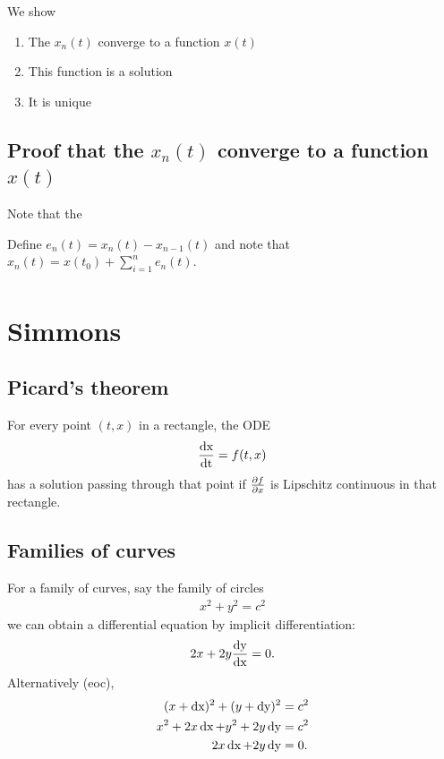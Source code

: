 \proof{}
We show
\begin{enumerate}
\item The $x_n(t)$ converge to a function $x(t)$
\item This function is a solution
\item It is unique
\end{enumerate}

\subsection{Proof that the $x_n(t)$ converge to a function $x(t)$}

Note that the

Define $e_n(t) = x_n(t) - x_{n-1}(t)$ and note that $x_n(t) = x(t_0) + \sum_{i=1}^n e_n(t)$.
\begin{align*}

\end{align*}

\newpage
\section{Simmons}

\subsection{Picard's theorem}
For every point $(t, x)$ in a rectangle, the ODE
\begin{align*}
  \frac{\operatorname{\text{dx}}}{\operatorname{\text{dt}}} = f(t, x)
\end{align*}
has a solution passing through that point if $\frac{\partial f}{\partial x}$ is Lipschitz
continuous in that rectangle.

\subsection{Families of curves}
For a family of curves, say the family of circles
\begin{align}
  x^2 + y^2 = c^2 \label{simmons-circles}
\end{align}
we can obtain a differential equation by implicit differentiation:
\begin{align}
  2x + 2y\frac{\operatorname{\text{dy}}}{\operatorname{\text{dx}}} = 0. \label{simmons-circles-de}
\end{align}
Alternatively (eoc),
\begin{align*}
  (x + \operatorname{\text{dx}})^2 + (y + \operatorname{\text{dy}})^2 &= c^2\\
  x^2 + 2x\operatorname{\text{dx}} + y^2 + 2y\operatorname{\text{dy}} &= c^2\\
        2x\operatorname{\text{dx}}  + 2y\operatorname{\text{dy}}     &= 0.
\end{align*}

